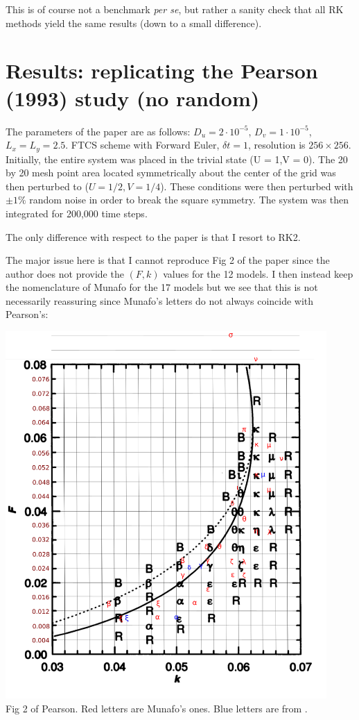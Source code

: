 This is of course not a benchmark {\it per se}, but rather a sanity check that 
all RK methods yield the same results (down to a small difference).


\newpage
\section*{Results: replicating the Pearson (1993) study (no random)}

The parameters of the paper are as follows: $D_u=2\cdot 10^{-5}$, $D_v=1\cdot 10^{-5}$,
$L_x=L_y=2.5$. FTCS scheme with Forward Euler, $\delta t=1$, 
resolution is $256 \times 256$.
Initially, the entire system was placed in
the trivial state (U = 1,V = 0). The 20 by 20 mesh point area located symmetrically
about the center of the grid was then
perturbed to ($U = 1/2,V = 1/4$). These
conditions were then perturbed with $\pm 1\%$
random noise in order to break the square
symmetry. The system was then integrated for 200,000 time steps.

The only difference with respect to the paper is that I resort to RK2.

The major issue here is that I cannot reproduce Fig 2 of the paper since the 
author does not provide the $(F,k)$ values for the 12 models. 
I then instead keep the nomenclature of Munafo for the 17 models but we 
see that this is not necessarily reassuring since Munafo's letters 
do not always coincide with Pearson's:
\begin{center}
\includegraphics[height=14cm]{python_codes/fieldstone_171/images/drawing.png}\\
{\captionfont Fig 2 of Pearson. Red letters are Munafo's ones. 
Blue letters are from .}
\end{center}





